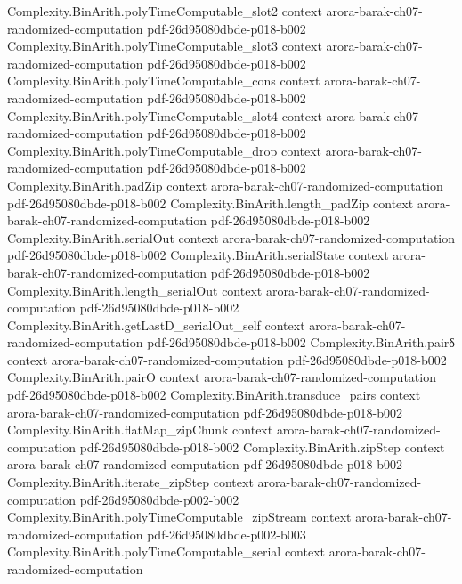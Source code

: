 \begin{theorem}
\proofstep
  {Complexity.BinArith.polyTimeComputable_slot2}
  {context}
  {arora-barak-ch07-randomized-computation}
  {pdf-26d95080dbde-p018-b002}
\proofstep
  {Complexity.BinArith.polyTimeComputable_slot3}
  {context}
  {arora-barak-ch07-randomized-computation}
  {pdf-26d95080dbde-p018-b002}
\proofstep
  {Complexity.BinArith.polyTimeComputable_cons}
  {context}
  {arora-barak-ch07-randomized-computation}
  {pdf-26d95080dbde-p018-b002}
\proofstep
  {Complexity.BinArith.polyTimeComputable_slot4}
  {context}
  {arora-barak-ch07-randomized-computation}
  {pdf-26d95080dbde-p018-b002}
\proofstep
  {Complexity.BinArith.polyTimeComputable_drop}
  {context}
  {arora-barak-ch07-randomized-computation}
  {pdf-26d95080dbde-p018-b002}
\proofstep
  {Complexity.BinArith.padZip}
  {context}
  {arora-barak-ch07-randomized-computation}
  {pdf-26d95080dbde-p018-b002}
\proofstep
  {Complexity.BinArith.length_padZip}
  {context}
  {arora-barak-ch07-randomized-computation}
  {pdf-26d95080dbde-p018-b002}
\proofstep
  {Complexity.BinArith.serialOut}
  {context}
  {arora-barak-ch07-randomized-computation}
  {pdf-26d95080dbde-p018-b002}
\proofstep
  {Complexity.BinArith.serialState}
  {context}
  {arora-barak-ch07-randomized-computation}
  {pdf-26d95080dbde-p018-b002}
\proofstep
  {Complexity.BinArith.length_serialOut}
  {context}
  {arora-barak-ch07-randomized-computation}
  {pdf-26d95080dbde-p018-b002}
\proofstep
  {Complexity.BinArith.getLastD_serialOut_self}
  {context}
  {arora-barak-ch07-randomized-computation}
  {pdf-26d95080dbde-p018-b002}
\proofstep
  {Complexity.BinArith.pairδ}
  {context}
  {arora-barak-ch07-randomized-computation}
  {pdf-26d95080dbde-p018-b002}
\proofstep
  {Complexity.BinArith.pairO}
  {context}
  {arora-barak-ch07-randomized-computation}
  {pdf-26d95080dbde-p018-b002}
\proofstep
  {Complexity.BinArith.transduce_pairs}
  {context}
  {arora-barak-ch07-randomized-computation}
  {pdf-26d95080dbde-p018-b002}
\proofstep
  {Complexity.BinArith.flatMap_zipChunk}
  {context}
  {arora-barak-ch07-randomized-computation}
  {pdf-26d95080dbde-p018-b002}
\proofstep
  {Complexity.BinArith.zipStep}
  {context}
  {arora-barak-ch07-randomized-computation}
  {pdf-26d95080dbde-p018-b002}
\proofstep
  {Complexity.BinArith.iterate_zipStep}
  {context}
  {arora-barak-ch07-randomized-computation}
  {pdf-26d95080dbde-p002-b002}
\proofstep
  {Complexity.BinArith.polyTimeComputable_zipStream}
  {context}
  {arora-barak-ch07-randomized-computation}
  {pdf-26d95080dbde-p002-b003}
\proofstep
  {Complexity.BinArith.polyTimeComputable_serial}
  {context}
  {arora-barak-ch07-randomized-computation}

\end{theorem}
